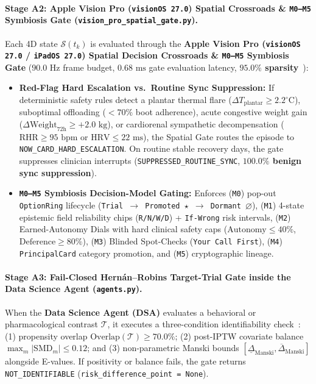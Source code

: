 \documentclass[10pt,twocolumn,letterpaper]{article}
\begin{document}
\paragraph{Stage A2: Apple Vision Pro (\texttt{visionOS 27.0}) Spatial Crossroads \& \texttt{M0--M5} Symbiosis Gate (\texttt{vision\_pro\_spatial\_gate.py}).}
Each 4D state $\mathcal{S}(t_k)$ is evaluated through the \textbf{Apple Vision Pro (\texttt{visionOS 27.0} / \texttt{iPadOS 27.0}) Spatial Decision Crossroads \& \texttt{M0--M5} Symbiosis Gate} ($90.0\text{ Hz}$ frame budget, $0.68\text{ ms}$ gate evaluation latency, \textbf{$95.0\%$ sparsity}~\cite{dasgupta2017neural}):
\begin{itemize}
    \item \textbf{Red-Flag Hard Escalation vs.\ Routine Sync Suppression:} If deterministic safety rules detect a plantar thermal flare ($\Delta T_{\text{plantar}} \ge 2.2^\circ\text{C}$), suboptimal offloading ($<70\%$ boot adherence), acute congestive weight gain ($\Delta\text{Weight}_{72\text{h}} \ge +2.0\text{ kg}$), or cardiorenal sympathetic decompensation ($\text{RHR} \ge 95\text{ bpm}$ or $\text{HRV} \le 22\text{ ms}$), the Spatial Gate routes the episode to \texttt{NOW\_CARD\_HARD\_ESCALATION}. On routine stable recovery days, the gate suppresses clinician interrupts (\texttt{SUPPRESSED\_ROUTINE\_SYNC}, \textbf{$100.0\%$ benign sync suppression}).
    \item \textbf{\texttt{M0--M5} Symbiosis Decision-Model Gating:} Enforces (\texttt{M0}) pop-out \texttt{OptionRing} lifecycle (\texttt{Trial $\rightarrow$ Promoted $\star$ $\rightarrow$ Dormant $\varnothing$}), (\texttt{M1}) 4-state epistemic field reliability chips (\texttt{R/N/W/D}) + \texttt{If-Wrong} risk intervals, (\texttt{M2}) Earned-Autonomy Dials with hard clinical safety caps (\textbf{$\text{Autonomy} \le 40\%$}, \textbf{$\text{Deference} \ge 80\%$}), (\texttt{M3}) Blinded Spot-Checks (\texttt{Your Call First}), (\texttt{M4}) \texttt{PrincipalCard} category promotion, and (\texttt{M5}) cryptographic lineage.
\end{itemize}

\paragraph{Stage A3: Fail-Closed Hern\'{a}n--Robins Target-Trial Gate inside the Data Science Agent (\texttt{agents.py}).}
When the \textbf{Data Science Agent (DSA)} evaluates a behavioral or pharmacological contrast $\mathcal{T}$, it executes a three-condition identifiability check~\cite{hernan2016using,manski1990nonparametric,vanderweele2017sensitivity}: (1) propensity overlap $\text{Overlap}(\mathcal{T}) \ge 70.0\%$; (2) post-IPTW covariate balance $\max_m |\text{SMD}_m| \le 0.12$; and (3) non-parametric Manski bounds $[\underline{\Delta}_{\text{Manski}}, \overline{\Delta}_{\text{Manski}}]$ alongside E-values. If positivity or balance fails, the gate returns \texttt{NOT\_IDENTIFIABLE} (\texttt{risk\_difference\_point = None}).
\end{document}
